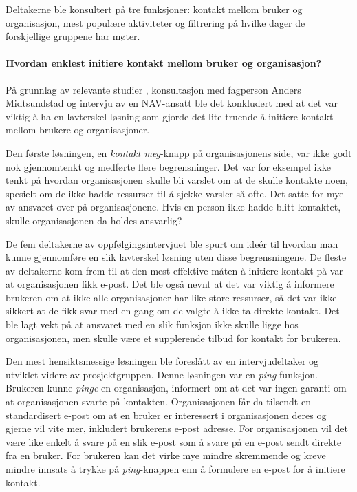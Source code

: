 Deltakerne ble konsultert på tre funksjoner: kontakt mellom bruker og organisasjon, mest populære aktiviteter og filtrering på hvilke dager de forskjellige gruppene har møter.

\paragraph{Hvordan enklest initiere kontakt mellom bruker og organisasjon?} 
På grunnlag av relevante studier \cite{NEWCOMERS:4:CT17}
, konsultasjon med fagperson Anders Midtsundstad \cite{MIDTSUNDSTAD-INTERVJU:15} og intervju av en NAV-ansatt \cite{NAV-INTERVJU:16} ble det konkludert med at det var viktig å ha en lavterskel løsning som gjorde det lite truende å initiere kontakt mellom brukere og organisasjoner.

Den første løsningen, en {\em  kontakt meg}-knapp på organisasjonens side, var ikke godt nok gjennomtenkt og medførte flere begrensninger. Det var for eksempel ikke tenkt på hvordan organisasjonen skulle bli varslet om at de skulle kontakte noen, spesielt om de ikke hadde ressurser til å sjekke varsler så ofte. Det satte for mye av ansvaret over på organisasjonene. Hvis en person ikke hadde blitt kontaktet, skulle organisasjonen da holdes ansvarlig?

De fem deltakerne av oppfølgingsintervjuet ble spurt om ideér til hvordan man kunne gjennomføre en slik lavterskel løsning uten disse begrensningene. De fleste av deltakerne kom frem til at den mest effektive måten å initiere kontakt på var at organisasjonen fikk e-post. Det ble også nevnt at det var viktig å informere brukeren om at ikke alle organisasjoner har like store ressurser, så det var ikke sikkert at de fikk svar med en gang om de valgte å ikke ta direkte kontakt. Det ble lagt vekt på at ansvaret med en slik funksjon ikke skulle ligge hos organisasjonen, men skulle være et supplerende tilbud for kontakt for brukeren. 

Den mest hensiktsmessige løsningen ble foreslått av en intervjudeltaker og utviklet videre av prosjektgruppen. Denne løsningen var en {\em ping} funksjon. Brukeren kunne {\em pinge} en organisasjon, informert om at det var ingen garanti om at organisasjonen svarte på kontakten. Organisasjonen får da tilsendt en standardisert e-post om at en bruker er interessert i organisasjonen deres og gjerne vil vite mer, inkludert brukerens e-post adresse. For organisasjonen vil det være like enkelt å svare på en slik e-post som å svare på en e-post sendt direkte fra en bruker. For brukeren kan det virke mye mindre skremmende og kreve mindre innsats å trykke på {\em ping}-knappen enn å formulere en e-post for å initiere kontakt.

